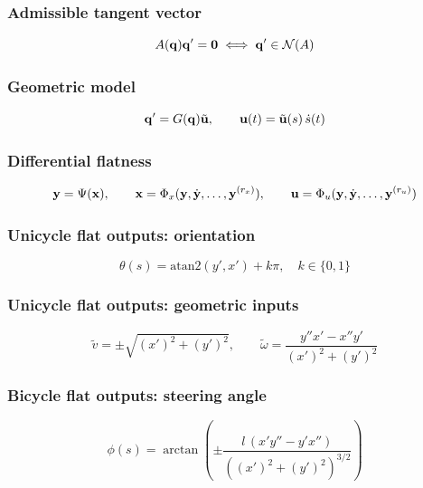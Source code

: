 \subsubsection{Admissible tangent vector}
\begin{equation*}
    A({\mathbf q}){\mathbf q}'=\mathbf 0\iff{\mathbf q}'\in\mathcal N(A)
\end{equation*}

\subsubsection{Geometric model}
\begin{equation*}
    {\mathbf q}'=G({\mathbf q})\tilde{\mathbf u},\qquad \mathbf u(t)=\tilde{\mathbf u}(s)\,\dot s(t)
\end{equation*}

\subsubsection{Differential flatness}
\begin{equation*}
    {\mathbf y}=\Psi(\mathbf x),\qquad \mathbf x=\Phi_x({\mathbf y},{\dot{\mathbf y}},\dots,{\mathbf y}^{(r_x)}),\qquad \mathbf u=\Phi_u({\mathbf y},{\dot{\mathbf y}},\dots,{\mathbf y}^{(r_u)})
\end{equation*}

\subsubsection{Unicycle flat outputs: orientation}
\begin{equation*}
    \theta(s)=\text{atan2}(y',x')+k\pi,\quad k\in\{0,1\}
\end{equation*}

\subsubsection{Unicycle flat outputs: geometric inputs}
\begin{equation*}
    \tilde v=\pm\sqrt{(x')^2+(y')^2},\qquad \tilde\omega=\frac{y''x'-x''y'}{(x')^2+(y')^2}
\end{equation*}

\subsubsection{Bicycle flat outputs: steering angle}
\begin{equation*}
    \phi(s)=\arctan\left(\pm\frac{l\,(x'y''-y'x'')}{\left((x')^2+(y')^2\right)^{3/2}}\right)
\end{equation*}

